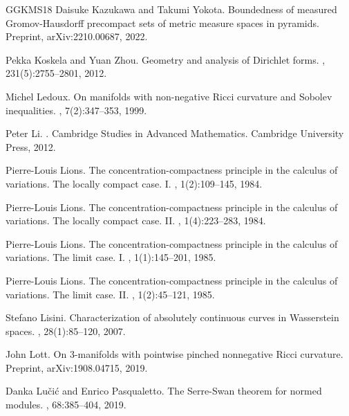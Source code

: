 \documentclass[11pt]{article}
\numberwithin{equation}{section}
\begin{document}
{\begin{thebibliography}{GGKMS18}
Daisuke Kazukawa and Takumi Yokota.
\newblock Boundedness of measured {G}romov-{H}ausdorff precompact sets of
  metric measure spaces in pyramids.
\newblock Preprint, arXiv:2210.00687, 2022.

Pekka Koskela and Yuan Zhou.
\newblock Geometry and analysis of {D}irichlet forms.
, 231(5):2755--2801, 2012.

Michel Ledoux.
\newblock On manifolds with non-negative {R}icci curvature and {S}obolev
  inequalities.
, 7(2):347--353, 1999.

Peter Li.
.
\newblock Cambridge Studies in Advanced Mathematics. Cambridge University
  Press, 2012.

Pierre-Louis Lions.
\newblock The concentration-compactness principle in the calculus of
  variations. {T}he locally compact case. {I}.
,
  1(2):109--145, 1984.

Pierre-Louis Lions.
\newblock The concentration-compactness principle in the calculus of
  variations. {T}he locally compact case. {II}.
,
  1(4):223--283, 1984.

Pierre-Louis Lions.
\newblock The concentration-compactness principle in the calculus of
  variations. {T}he limit case. {I}.
, 1(1):145--201, 1985.

Pierre-Louis Lions.
\newblock The concentration-compactness principle in the calculus of
  variations. {T}he limit case. {II}.
, 1(2):45--121, 1985.

Stefano Lisini.
\newblock Characterization of absolutely continuous curves in {W}asserstein
  spaces.
, 28(1):85--120, 2007.

John Lott.
\newblock On 3-manifolds with pointwise pinched nonnegative {R}icci curvature.
\newblock Preprint, arXiv:1908.04715, 2019.

Danka Lu\v{c}i\'{c} and Enrico Pasqualetto.
\newblock The {S}erre-{S}wan theorem for normed modules.
,
  68:385--404, 2019.


\end{thebibliography}}
\end{document}
